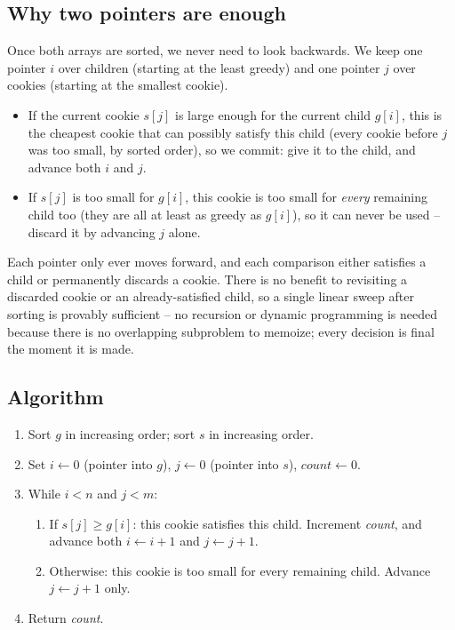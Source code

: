 \subsection*{Why two pointers are enough}

Once both arrays are sorted, we never need to look backwards. We keep one
pointer $i$ over children (starting at the least greedy) and one pointer $j$
over cookies (starting at the smallest cookie).

\begin{itemize}
  \item If the current cookie $s[j]$ is large enough for the current child
        $g[i]$, this is the cheapest cookie that can possibly satisfy this
        child (every cookie before $j$ was too small, by sorted order), so we
        commit: give it to the child, and advance both $i$ and $j$.
  \item If $s[j]$ is too small for $g[i]$, this cookie is too small for
        \emph{every} remaining child too (they are all at least as greedy as
        $g[i]$), so it can never be used -- discard it by advancing $j$ alone.
\end{itemize}

Each pointer only ever moves forward, and each comparison either satisfies a
child or permanently discards a cookie. There is no benefit to revisiting a
discarded cookie or an already-satisfied child, so a single linear sweep after
sorting is provably sufficient -- no recursion or dynamic programming is
needed because there is no overlapping subproblem to memoize; every decision
is final the moment it is made.

\subsection*{Algorithm}

\begin{enumerate}
  \item Sort $g$ in increasing order; sort $s$ in increasing order.
  \item Set $i \gets 0$ (pointer into $g$), $j \gets 0$ (pointer into $s$),
        $\textit{count} \gets 0$.
  \item While $i < n$ and $j < m$:
  \begin{enumerate}
    \item If $s[j] \ge g[i]$: this cookie satisfies this child. Increment
          \textit{count}, and advance both $i \gets i+1$ and $j \gets j+1$.
    \item Otherwise: this cookie is too small for every remaining child.
          Advance $j \gets j+1$ only.
  \end{enumerate}
  \item Return \textit{count}.
\end{enumerate}

